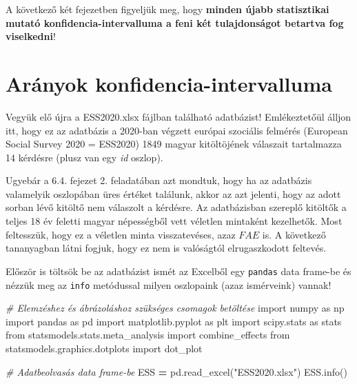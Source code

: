 \documentclass[
]{book}
\newenvironment{Shaded}{\begin{snugshade}}{\end{snugshade}}
\newcommand{\CommentTok}[1]{\textcolor[rgb]{0.56,0.35,0.01}{\textit{#1}}}
\newcommand{\ImportTok}[1]{#1}
\newcommand{\NormalTok}[1]{#1}
\newcommand{\OperatorTok}[1]{\textcolor[rgb]{0.81,0.36,0.00}{\textbf{#1}}}
\newcommand{\StringTok}[1]{\textcolor[rgb]{0.31,0.60,0.02}{#1}}
\begin{document}
A következő két fejezetben figyeljük meg, hogy \textbf{minden újabb statisztikai mutató konfidencia-intervalluma a feni két tulajdonságot betartva fog viselkedni}!

\section{Arányok konfidencia-intervalluma}\label{aruxe1nyok-konfidencia-intervalluma}

Vegyük elő újra a ESS2020.xlsx fájlban található adatbázist! Emlékeztetőül álljon itt, hogy ez az adatbázis a 2020-ban végzett európai szociális felmérés (European Social Survey 2020 = ESS2020) 1849 magyar kitöltöjének válaszait tartalmazza 14 kérdésre (plusz van egy \emph{id} oszlop).

Ugyebár a 6.4. fejezet 2. feladatában azt mondtuk, hogy ha az adatbázis valamelyik oszlopában üres értéket találunk, akkor az azt jelenti, hogy az adott sorban lévő kitöltő nem válaszolt a kérdésre. Az adatbázisban szereplő kitöltők a teljes 18 év feletti magyar népességből vett véletlen mintaként kezelhetők. Most feltesszük, hogy ez a véletlen minta visszatevéses, azaz \(FAE\) is. A következő tananyagban látni fogjuk, hogy ez nem is valóságtól elrugaszkodott feltevés.

Először is töltsök be az adatbázist ismét az Excelből egy \texttt{pandas} data frame-be és nézzük meg az \texttt{info} metódussal milyen oszlopaink (azaz ismérveink) vannak!

\begin{Shaded}
\begin{Highlighting}[]
\CommentTok{\# Elemzéshez és ábrázoláshoz szükséges csomagok betöltése}
\ImportTok{import}\NormalTok{ numpy }\ImportTok{as}\NormalTok{ np}
\ImportTok{import}\NormalTok{ pandas }\ImportTok{as}\NormalTok{ pd}
\ImportTok{import}\NormalTok{ matplotlib.pyplot }\ImportTok{as}\NormalTok{ plt}
\ImportTok{import}\NormalTok{ scipy.stats }\ImportTok{as}\NormalTok{ stats}
\ImportTok{from}\NormalTok{ statsmodels.stats.meta\_analysis }\ImportTok{import}\NormalTok{ combine\_effects}
\ImportTok{from}\NormalTok{ statsmodels.graphics.dotplots }\ImportTok{import}\NormalTok{ dot\_plot}

\CommentTok{\# Adatbeolvasás data frame{-}be}
\NormalTok{ESS }\OperatorTok{=}\NormalTok{ pd.read\_excel(}\StringTok{"ESS2020.xlsx"}\NormalTok{)}
\NormalTok{ESS.info()}
\end{Highlighting}
\end{Shaded}
\end{document}
